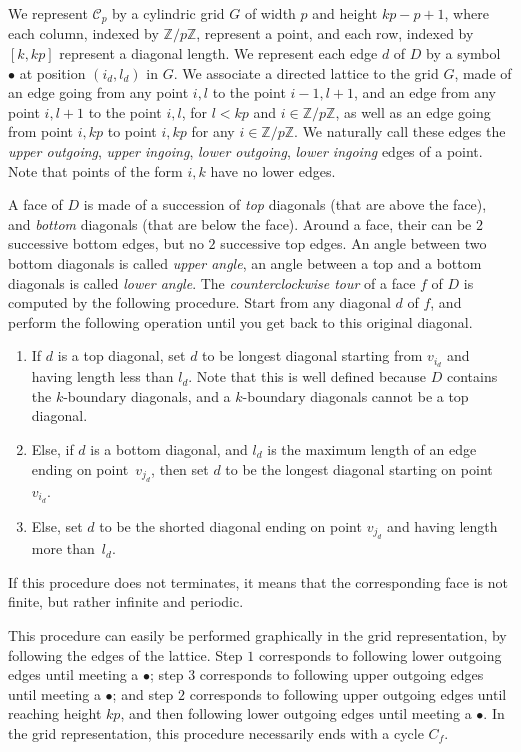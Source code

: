 \documentclass{amsart}
\theoremstyle{remark}
\newcommand{\Z}{\mathbb{Z}} %
\newcommand{\cylinder}{\mathcal{C}}
\begin{document}
We represent $\cylinder_p$ by a cylindric grid $G$ of width $p$ and height $kp-p+1$, where each column, indexed by $\Z/p\Z$, represent a point, and each row, indexed by $[k,kp]$ represent a diagonal length.
We represent each edge $d$ of $D$ by a symbol $\bullet$ at position $(i_d,l_d)$ in $G$.
We associate a directed lattice to the grid $G$, made of an edge going from any point $i,l$ to the point $i-1,l+1$, and an edge from any point $i,l+1$ to the point $i,l$, for $l<kp$ and $i\in\Z/p\Z$, as well as an edge going from point $i,kp$ to point $i,kp$ for any $i\in\Z/p\Z$.
We naturally call these edges the \emph{upper outgoing}, \emph{upper ingoing}, \emph{lower outgoing}, \emph{lower ingoing} edges of a point. Note that points of the form $i,k$ have no lower edges.

A face of $D$ is made of a succession of \emph{top} diagonals (that are above the face), and \emph{bottom} diagonals (that are below the face). Around a face, their can be $2$ successive bottom edges, but no $2$ successive top edges. An angle between two bottom diagonals is called \emph{upper angle}, an angle between a top and a bottom diagonals is called \emph{lower angle}.
The \emph{counterclockwise tour} of a face $f$ of $D$ is computed by the following procedure. Start from any diagonal $d$ of $f$, and perform the following operation until you get back to this original diagonal.
\begin{enumerate}
\item If $d$ is a top diagonal, set $d$ to be longest diagonal starting from $v_{i_d}$ and having length less than $l_d$. Note that this is well defined because $D$ contains the $k$-boundary diagonals, and a $k$-boundary diagonals cannot be a top diagonal.
\item Else, if $d$ is a bottom diagonal, and $l_d$ is the maximum length of an edge ending on point~$v_{j_d}$, then set $d$ to be the longest diagonal starting on point~$v_{i_d}$.
\item Else, set $d$ to be the shorted diagonal ending on point $v_{j_d}$ and having length more than~$l_d$.
\end{enumerate}
If this procedure does not terminates, it means that the corresponding face is not finite, but rather infinite and periodic.

This procedure can easily be performed graphically in the grid representation, by following the edges of the lattice. Step $1$ corresponds to following lower outgoing edges until meeting a $\bullet$; step $3$ corresponds to following upper outgoing edges until meeting a $\bullet$; and step $2$ corresponds to following upper outgoing edges until reaching height $kp$, and then following lower outgoing edges until meeting a $\bullet$.
In the grid representation, this procedure necessarily ends with a cycle $C_f$.
\end{document}
